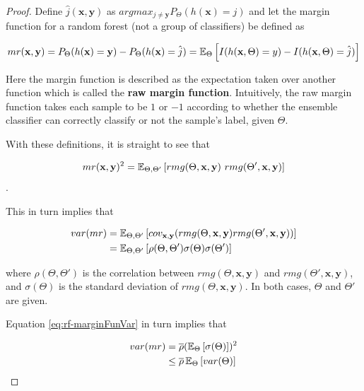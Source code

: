 \begin{proof}
	Define $\hat{j}(\textbf{x},\textbf{y})$ as $arg max_{j\neq \textbf{y}} P_{\Theta}(h(\textbf{x}) = j)$ and let the margin function for a random forest (not a group of classifiers) be defined as
	
	\[\label{eq:rf-marginFunRf}
	mr(\textbf{x},\textbf{y}) = P_{\Theta}(h(\textbf{x}) = \textbf{y}) - P_{\Theta}(h(\textbf{x}) = \hat{j})
	\\
	= \operatorname{\mathbb{E}}_{\Theta} \left[ I(h(\textbf{x},\Theta ) = y ) - I( h( \textbf{x},\Theta ) = \hat{j} ) \right]
	\]
	
	
	
	
	Here the margin function is described as the expectation taken over another function which is called the \textbf{raw margin function}\label{eq:rf-rawMarginFun}. Intuitively, the raw margin function takes each sample to be $1$ or $-1$ according to whether the ensemble classifier can correctly classify or not the sample's label, given $\Theta$.
	
	With these definitions, it is straight to see that
	
	\[
	mr( \textbf{x},\textbf{y} )^2 = \Expect_{\Theta, \Theta'} \left[ rmg( \Theta,\textbf{x},\textbf{y} ) \ rmg(\Theta',\textbf{x},\textbf{y} ) \right] 
	\].
	
	This in turn implies that
	
	\[\label{eq:rf-marginFunVar}
	\begin{split}
	var(mr) & = \operatorname{\mathbb{E}}_{\Theta, \Theta'}
	\left[
	cov_{\textbf{x},\textbf{y}}
	(rmg(\Theta,\textbf{x},\textbf{y} )rmg(\Theta',\textbf{x},\textbf{y} ))
	\right] \\
	& = \operatorname{\mathbb{E}}_{\Theta, \Theta'}
	\left[
	\rho(\Theta, \Theta')\sigma(\Theta)\sigma(\Theta')
	\right]
	\end{split}
	\]
	
	where $ \rho(\Theta, \Theta')$ is the correlation between $rmg(\Theta,\textbf{x},\textbf{y})$ and $rmg(\Theta',\textbf{x},\textbf{y})$, and $\sigma(\Theta)$ is the standard deviation of $rmg(\Theta,\textbf{x},\textbf{y})$. In both cases, $\Theta$ and $\Theta'$ are given.%
	
	Equation \cref{eq:rf-marginFunVar} in turn implies that
	
	\[\label{eq:rf-varianceBound}
	\begin{split}
	var(mr) & = \overline{\rho} (\operatorname{\mathbb{E}}_{\Theta}\left[ \sigma(\Theta)\right] )^2 \\
	& \leq \overline{\rho} \operatorname{\mathbb{E}}_{\Theta} \left[ var(\Theta) \right]
	\end{split}
	\]
	

\end{proof}
